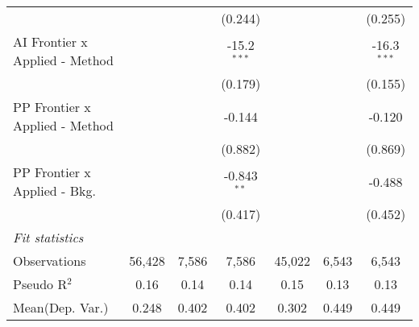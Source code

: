 \begin{tabular}{lcccccc}
                                  &                &                & (0.244)        &                &                & (0.255)\\   
   AI Frontier x Applied - Method &                &                & -15.2$^{***}$  &                &                & -16.3$^{***}$\\   
                                  &                &                & (0.179)        &                &                & (0.155)\\   
   PP Frontier x Applied - Method &                &                & -0.144         &                &                & -0.120\\   
                                  &                &                & (0.882)        &                &                & (0.869)\\   
   PP Frontier x Applied - Bkg.   &                &                & -0.843$^{**}$  &                &                & -0.488\\   
                                  &                &                & (0.417)        &                &                & (0.452)\\   
   \midrule
   \emph{Fit statistics}\\
   Observations                   & 56,428         & 7,586          & 7,586          & 45,022         & 6,543          & 6,543\\  
   Pseudo R$^2$                   & 0.16           & 0.14           & 0.14           & 0.15           & 0.13           & 0.13\\  
Mean(Dep. Var.) & 0.248 & 0.402 & 0.402 & 0.302 & 0.449 & 0.449 \\
   

\end{tabular}
